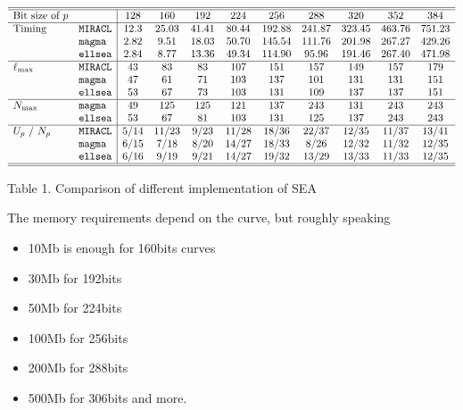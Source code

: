 \documentclass[11pt]{article}
\def\ellsea{\texttt{ellsea}\xspace}
\def\MIRACL{\texttt{MIRACL}\xspace}
\def\magma{\texttt{magma}\xspace}
\begin{document}
\begin{small}
\renewcommand{\arraystretch}{1.6}
$$\begin{array}{ll|ccccccccc }\hline\hline
\text{Bit size of $p$} & &  128&    160&    192&    224&      256&    288&    320&    352&  384
\\\hline
\text{Timing}
&\MIRACL    &  12.3&  25.03&  41.41&  80.44&   192.88& 241.87& 323.45& 463.76& 751.23\\
&\magma     &  2.82&   9.51&  18.03&  50.70&   145.54& 111.76& 201.98& 267.27& 429.26\\

&\ellsea    &  2.84&   8.77&  13.36&  49.34&   114.90&  95.96& 191.46& 267.40& 471.98                \\\hline
\ell_\text{max}
&\MIRACL    &    43&     83&     83&    107&      151&    157&    149&    157&    179\\

&\magma     &    47&     61&     71&    103&      137&    101&    131&    131&    151\\
&\ellsea    &    53&     67&     73&    103&      131&    109&    137&    137&    151\\\hline

N_\text{max}
&\magma     &    49&    125&    125&    121&      137&    243&    131&    243&    243\\
&\ellsea    &    53&     67&     81&    103&      131&    125&    137&    243&    243\\\hline

\text{$U_p$ / $N_p$}
&\MIRACL    &  5/14&  11/23&   9/23&  11/28&    18/36&   22/37&  12/35&  11/37&  13/41 \\
&\magma     &  6/15&   7/18&   8/20&  14/27&    18/33&    8/26&  12/32&  11/32&  12/35 \\
&\ellsea    &  6/16&   9/19&   9/21&  14/27&    19/32&   13/29&  13/33&  11/33&  12/35 \\
\hline\hline
\end{array}
$$
\centerline{\normalsize{\sc Table 1.} {Comparison of different implementation of SEA}\label{comparison}}
\end{small}

The memory requirements depend on the curve, but roughly speaking
\begin{itemize}
\item 10Mb is enough for 160bits curves
\item 30Mb for 192bits
\item 50Mb for 224bits
\item 100Mb for 256bits
\item 200Mb for 288bits
\item 500Mb for 306bits and more.
\end{itemize}
\end{document}
